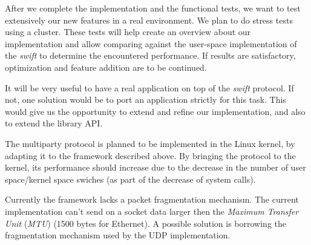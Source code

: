 After we complete the implementation and the functional tests, we want to test
extensively our new features in a real environment. We plan to do stress tests
using a cluster. These tests will help create an overview about our
implementation and allow comparing against the user-space implementation of the
\textit{swift} to determine the encountered performance. If
results are satisfactory, optimization and feature addition are to be
continued.

It will be very useful to have a real application on top of the \textit{swift}
protocol. If not, one solution would be to port an application strictly for
this task. This would give us the opportunity to extend and refine our
implementation, and also to extend the library API.

The multiparty protocol is planned to be implemented in the Linux kernel, by
adapting it to the framework described above. By bringing the protocol to the
kernel, its performance should increase due to the decrease in the number of
user space/kernel space swiches (as part of the decrease of system calls).

Currently the framework lacks a packet fragmentation mechanism. The current
implementation can't send on a socket data larger then the \textit{Maximum
Transfer Unit} (\textit{MTU}) (1500 bytes for Ethernet). A possible solution
is borrowing the fragmentation mechanism used by the UDP implementation.
